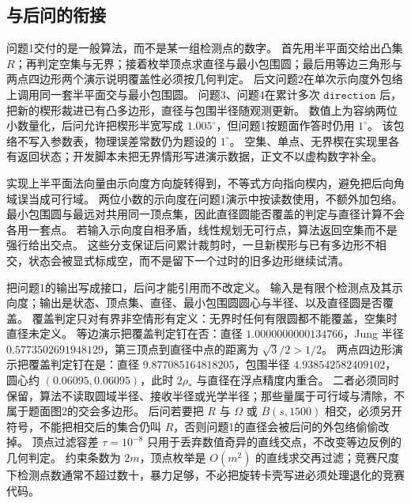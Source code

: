\subsection{与后问的衔接}

问题1交付的是一般算法，而不是某一组检测点的数字。
首先用半平面交给出凸集 $R$；再判定空集与无界；接着枚举顶点求直径与最小包围圆；最后用等边三角形与两点四边形两个演示说明覆盖性必须按几何判定。
后文问题2在单次示向度外包络上调用同一套半平面交与最小包围圆。
问题3、问题4在累计多次 $\mathtt{direction}$ 后，把新的楔形裁进已有凸多边形，直径与包围半径随观测更新。
数值上为容纳两位小数量化，后问允许把楔形半宽写成 $1.005^\circ$，但问题1按题面作答时仍用 $1^\circ$。
该包络不写入参数表，物理误差常数仍为题设的 $1^\circ$。
空集、单点、无界楔在实现里各有返回状态；开发脚本未把无界情形写进演示数据，正文不以虚构数字补全。

实现上半平面法向量由示向度方向旋转得到，不等式方向指向楔内，避免把后向角域误当成可行域。
两位小数的示向度在问题1演示中按读数使用，不额外加包络。
最小包围圆与最远对共用同一顶点集，因此直径圆能否覆盖的判定与直径计算不会各用一套点。
若输入示向度自相矛盾，线性规划无可行点，算法返回空集而不是强行给出交点。
这些分支保证后问累计裁剪时，一旦新楔形与已有多边形不相交，状态会被显式标成空，而不是留下一个过时的旧多边形继续试清。

把问题1的输出写成接口，后问才能引用而不改定义。
输入是有限个检测点及其示向度；输出是状态、顶点集、直径、最小包围圆圆心与半径、以及直径圆是否覆盖。
覆盖判定只对有界非空情形有定义：无界时任何有限圆都不能覆盖，空集时直径未定义。
等边演示把覆盖判定钉在否：直径 $1.0000000000134766$，Jung 半径 $0.5773502691948129$，第三顶点到直径中点的距离为 $\sqrt{3}/2>1/2$。
两点四边形演示把覆盖判定钉在是：直径 $9.877085164818205$，包围半径 $4.938542582409102$，圆心约 $(0.06095,0.06095)$，此时 $2\rho_\ast$ 与直径在浮点精度内重合。
二者必须同时保留，算法不读取圆域半径、接收半径或光学半径；那些量属于可行域与清除，不属于题面图2的交会多边形。
后问若要把 $R$ 与 $\Omega$ 或 $\overline B(s,1500)$ 相交，必须另开符号，不能把相交后的集合仍叫 $R$，否则问题1的直径会被后问的外包络偷偷改掉。
顶点过滤容差 $\tau=10^{-8}$ 只用于丢弃数值奇异的直线交点，不改变等边反例的几何判定。
约束条数为 $2m$，顶点枚举是 $O(m^2)$ 的直线求交再过滤；竞赛尺度下检测点数通常不超过数十，暴力足够，不必把旋转卡壳写进必须处理退化的竞赛代码。

